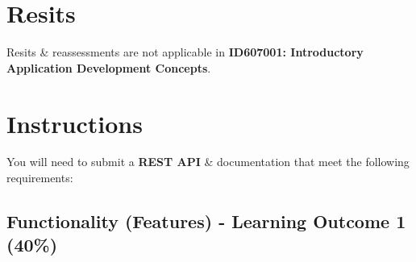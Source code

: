 \documentclass{article}
\begin{document}
\section*{Resits}
Resits \& reassessments are not applicable in \textbf{ID607001: Introductory Application Development Concepts}.

\newpage

\section*{Instructions}
You will need to submit a \textbf{REST API} \& documentation that meet the following requirements:

\subsection*{Functionality (Features) - Learning Outcome 1 (40\%)}
\end{document}
